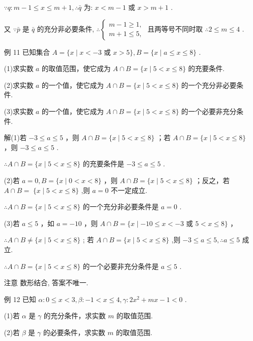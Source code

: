 \documentclass[10pt]{article}
\begin{document}
\(\because q : m - 1 \leq  x \leq  m + 1,\therefore \bar{q}\) 为: \(x < m - 1\) 或 \(x > m + 1\) .

又 \(\because \bar{p}\) 是 \(\bar{q}\) 的充分非必要条件, \(\therefore \left\{  \begin{array}{l} m - 1 \geq  1, \\  m + 1 \leq  5, \end{array}\right.\) 且两等号不同时取 \(\therefore 2 \leq  m \leq  4\) .

例 11 已知集合 \(A = \{ x \mid  x <  - 3\) 或 \(x > 5\} ,B = \{ x \mid  a \leq  x \leq  8\}\) .

(1)求实数 \(a\) 的取值范围，使它成为 \(A \cap  B = \{ x \mid  5 < x \leq  8\}\) 的充要条件.

(2)求实数 \(a\) 的一个值，使它成为 \(A \cap  B = \{ x \mid  5 < x \leq  8\}\) 的一个充分非必要条件.

(3)求实数 \(a\) 的一个值，使它成为 \(A \cap  B = \{ x \mid  5 < x \leq  8\}\) 的一个必要非充分条件.

解(1)若 \(- 3 \leq  a \leq  5\) ，则 \(A \cap  B = \{ x \mid  5 < x \leq  8\}\) ；若 \(A \cap  B = \{ x \mid  5 < x \leq  8\}\) ，则 \(- 3 \leq  a \leq  5\) .

\(\therefore A \cap  B = \{ x \mid  5 < x \leq  8\}\) 的充要条件是 \(- 3 \leq  a \leq  5\) .

(2)若 \(a = 0,B = \{ x \mid  0 < x < 8\}\) ，则 \(A \cap  B = \{ x \mid  5 < x \leq  8\}\) ；反之，若 \(A \cap  B = \; \{ x \mid  5 < x \leq  8\}\) ,则 \(a = 0\) 不一定成立.

\(\therefore A \cap  B = \{ x \mid  5 < x \leq  8\}\) 的一个充分非必要条件是 \(a = 0\) .

(3)若 \(a \leq  5\) ，如 \(a =  - {10}\) ，则 \(A \cap  B = \{ x \mid   - {10} \leq  x <  - 3\) 或 \(5 < x \leq  8\}\) ，

\(\therefore A \cap  B \neq  \{ x \mid  5 < x \leq  8\}\) ; 若 \(A \cap  B = \{ x \mid  5 < x \leq  8\}\) ,则 \(- 3 \leq  a \leq  5,\therefore a \leq  5\) 成立.

\(\therefore A \cap  B = \{ x \mid  5 < x \leq  8\}\) 的一个必要非充分条件是 \(a \leq  5\) .

注意 数形结合, 答案不唯一.

例 12 已知 \(\alpha  : 0 \leq  x < 3,\beta  :  - 1 < x \leq  4,\gamma  : 2{x}^{2} + {mx} - 1 < 0\) .

(1)若 \(\alpha\) 是 \(\gamma\) 的充分条件，求实数 \(m\) 的取值范围.

(2)若 \(\beta\) 是 \(\gamma\) 的必要条件，求实数 \(m\) 的取值范围.
\end{document}

